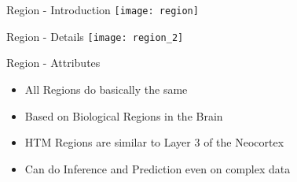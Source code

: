 \begin{frame}[c]{Region - Introduction}
    \pause
    \texttt{[image: region]}
\end{frame}


\begin{frame}[c]{Region - Details}
    \texttt{[image: region\_2]}
\end{frame}


\begin{frame}[c]{Region - Attributes}
    \begin{itemize}[<+(1)->]
        \item All Regions do basically the same
        \item Based on Biological Regions in the Brain
        \item HTM Regions are similar to Layer 3 of the Neocortex
        \item Can do Inference and Prediction even on complex data
    \end{itemize}
\end{frame}


